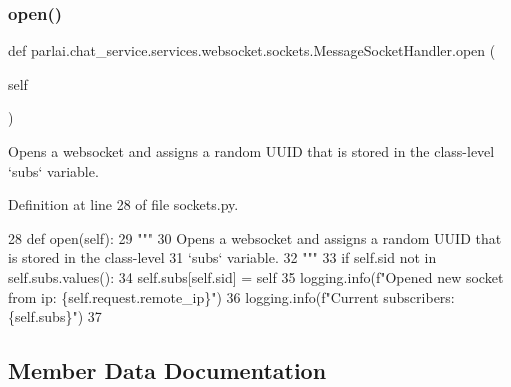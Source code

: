 \subsubsection{\texorpdfstring{open()}{open()}}
{\footnotesize\ttfamily def parlai.\+chat\+\_\+service.\+services.\+websocket.\+sockets.\+Message\+Socket\+Handler.\+open (\begin{DoxyParamCaption}\item[{}]{self }\end{DoxyParamCaption})}

\begin{DoxyVerb}Opens a websocket and assigns a random UUID that is stored in the class-level
`subs` variable.
\end{DoxyVerb}
 

Definition at line 28 of file sockets.\+py.


\begin{DoxyCode}
28     \textcolor{keyword}{def }open(self):
29         \textcolor{stringliteral}{"""}
30 \textcolor{stringliteral}{        Opens a websocket and assigns a random UUID that is stored in the class-level}
31 \textcolor{stringliteral}{        `subs` variable.}
32 \textcolor{stringliteral}{        """}
33         \textcolor{keywordflow}{if} self.sid \textcolor{keywordflow}{not} \textcolor{keywordflow}{in} self.subs.values():
34             self.subs[self.sid] = self
35             logging.info(f\textcolor{stringliteral}{"Opened new socket from ip: \{self.request.remote\_ip\}"})
36             logging.info(f\textcolor{stringliteral}{"Current subscribers: \{self.subs\}"})
37 
\end{DoxyCode}


\subsection{Member Data Documentation}
\mbox{\label{classparlai_1_1chat__service_1_1services_1_1websocket_1_1sockets_1_1MessageSocketHandler_ae97ee5ffb1b97863c68c32bbe89cde5e}} 
